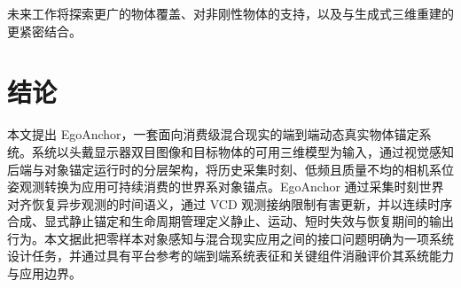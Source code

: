 \documentclass[review]{vgtc}
\begin{document}
未来工作将探索更广的物体覆盖、对非刚性物体的支持，以及与生成式三维重建的更紧密结合。

\section{结论}\label{sec:conclusion}

本文提出 EgoAnchor，一套面向消费级混合现实的端到端动态真实物体锚定系统。系统以头戴显示器双目图像和目标物体的可用三维模型为输入，通过视觉感知后端与对象锚定运行时的分层架构，将历史采集时刻、低频且质量不均的相机系位姿观测转换为应用可持续消费的世界系对象锚点。EgoAnchor 通过采集时刻世界对齐恢复异步观测的时间语义，通过 VCD 观测接纳限制有害更新，并以连续时序合成、显式静止锚定和生命周期管理定义静止、运动、短时失效与恢复期间的输出行为。本文据此把零样本对象感知与混合现实应用之间的接口问题明确为一项系统设计任务，并通过具有平台参考的端到端系统表征和关键组件消融评价其系统能力与应用边界。




\end{document}
